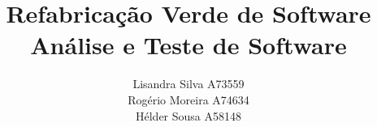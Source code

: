\title{
    \large{Refabricação Verde de Software\\}
    \vspace{2mm}
    {Análise e Teste de Software}
    }

\author{
Lisandra Silva A73559\\
Rogério Moreira A74634\\
Hélder Sousa A58148}


\maketitle